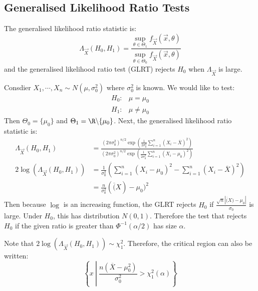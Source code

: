 \documentclass[../Main.tex]{subfiles}
\begin{document}
\subsection{Generalised Likelihood Ratio Tests}
The generalised likelihood ratio statistic is:
\begin{equation*}
    \Lambda_{\vec{X}}(H_0, H_1) = \frac{\sup_{\theta \in \Theta_1}f_{\vec{X}}(\vec{x}, \theta)}{\sup_{\theta \in \Theta_0}f_{\vec{X}}(\vec{x}, \theta)}
\end{equation*}
and the generalised likelihood ratio test (GLRT) rejects $H_0$ when $\Lambda_{\vec{X}}$ is large.
\begin{example}
    Consdier $X_1, \cdots, X_n \sim N(\mu, \sigma_0^2)$ where $\sigma_0^2$ is known. We would like to test:
    \begin{align*}
        H_0:&\mu = \mu_0 \\
        H_1:&\mu \neq \mu_0
    \end{align*}
    Then $\Theta_0 = \{\mu_0\}$ and $\Theta_1 = \R \backslash \{\mu_0\}$. Next, the generalised likelihood ratio statistic is:
    \begin{align*}
        \Lambda_{\vec{X}}(H_0, H_1) &= \frac{(2\pi \sigma_0^2)^{n / 2} \exp\left(\frac{1}{2\sigma_0^2} \sum_{i=1}^{n} (X_i - \overline{X})^2\right)}{(2\pi \sigma_0^2)^{n / 2} \exp\left(\frac{1}{2\sigma_0^2} \sum_{i=1}^{n} (X_i - \mu_0)^2\right)} \\
        2\log(\Lambda_{\vec{X}}(H_0, H_1)) &= \frac{1}{\sigma_0^2} \left(\sum_{i=1}^{n} (X_i - \mu_0)^2 - \sum_{i=1}^{n} (X_i - \overline{X})^2\right) \\
        &= \frac{n}{\sigma_0^2} (\overline(X) - \mu_0)^2
    \end{align*}
    Then because $\log$ is an increasing function, the GLRT rejects $H_0$ if $\frac{\sqrt{n}|\overline(X) - \mu_0|}{\sigma_0}$ is large. Under $H_0$, this has distribution $N(0, 1)$. Therefore the test that rejects $H_0$ if the given ratio is greater than $\Phi^{-1}(\alpha / 2)$ has size $\alpha$.

    Note that $2\log(\Lambda_{\vec{X}}(H_0, H_1)) \sim \chi_1^2$. Therefore, the critical region can also be written:
    \begin{equation*}
        \left\{x~\left|~\frac{n(\overline{X} - \mu_0^2)}{\sigma_0^2} > \chi_1^2(\alpha)\right.\right\}
    \end{equation*}
    \label{expTwoSideNormalTest}
\end{example}
\end{document}
